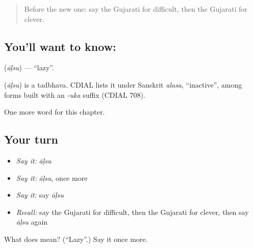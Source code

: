 \label{lesson:GU-C133-alsu}



\begin{quote}
Before the new one: say the Gujarati for difficult, then the Gujarati for clever.
\end{quote}

\subsection*{You'll want to know: }
\textbf{} (\emph{āḷsu}) — \textquotedblleft{}lazy\textquotedblright{}.

\begin{cousinweb}
\textbf{} (\emph{āḷsu}) is a tadbhava. CDIAL lists it under Sanskrit \emph{alasa}, \textquotedblleft{}inactive\textquotedblright{}, among forms built with an \emph{-uka} suffix (CDIAL 708).
\end{cousinweb}

\begin{grammarlens}[title={What you've built}]
One more word for this chapter.
\end{grammarlens}

\subsection*{Your turn}
\begin{itemize}
\raggedright
  \item \emph{Say it:} \emph{āḷsu}
  \item \emph{Say it:} \emph{āḷsu}, once more
  \item \emph{Say it:} say \emph{āḷsu}
  \item \emph{Recall:} say the Gujarati for difficult, then the Gujarati for clever, then say \emph{āḷsu} again
\end{itemize}

\begin{tcolorbox}[breakable,colback=teal!4,colframe=teal!35!black,title={Before you move on}]
What does  mean? (\textquotedblleft{}Lazy\textquotedblright{}.) Say it once more.
\end{tcolorbox}
